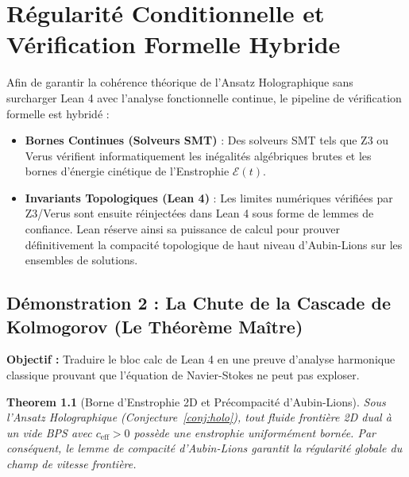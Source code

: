 \documentclass[11pt,twoside,openright]{book}
\newtheorem{theorem}{Theorem}[chapter]
\begin{document}
\chapter{Régularité Conditionnelle et Vérification Formelle Hybride}

Afin de garantir la cohérence théorique de l'Ansatz Holographique sans surcharger Lean 4 avec l'analyse fonctionnelle continue, le pipeline de vérification formelle est hybridé :
\begin{itemize}
\item \textbf{Bornes Continues (Solveurs SMT)} : Des solveurs SMT tels que Z3 ou Verus vérifient informatiquement les inégalités algébriques brutes et les bornes d'énergie cinétique de l'Enstrophie $\mathcal{E}(t)$.
\item \textbf{Invariants Topologiques (Lean 4)} : Les limites numériques vérifiées par Z3/Verus sont ensuite réinjectées dans Lean 4 sous forme de lemmes de confiance. Lean réserve ainsi sa puissance de calcul pour prouver définitivement la compacité topologique de haut niveau d'Aubin-Lions sur les ensembles de solutions.
\end{itemize}

\section{Démonstration 2 : La Chute de la Cascade de Kolmogorov (Le Théorème Maître)}

\textbf{Objectif :} Traduire le bloc calc de Lean 4 en une preuve d'analyse harmonique classique prouvant que l'équation de Navier-Stokes ne peut pas exploser.

\begin{theorem}[Borne d'Enstrophie 2D et Précompacité d'Aubin-Lions]\label{thm:enstrophy}
Sous l'Ansatz Holographique (Conjecture~\ref{conj:holo}), tout fluide frontière 2D dual à un vide BPS avec $c_{\text{eff}} > 0$ possède une enstrophie uniformément bornée. Par conséquent, le lemme de compacité d'Aubin-Lions garantit la régularité globale du champ de vitesse frontière.
\end{theorem}
\end{document}
